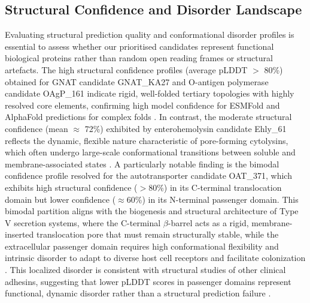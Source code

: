 \documentclass[pdflatex,sn-mathphys-num]{sn-jnl}
\begin{document}
\subsection{Structural Confidence and Disorder Landscape}
Evaluating structural prediction quality and conformational disorder profiles is essential to assess whether our prioritised candidates represent functional biological proteins rather than random open reading frames or structural artefacts. The high structural confidence profiles (average pLDDT $>$ 80\%) obtained for GNAT candidate GNAT\_KA27 and O-antigen polymerase candidate OAgP\_161 indicate rigid, well-folded tertiary topologies with highly resolved core elements, confirming high model confidence for ESMFold and AlphaFold predictions for complex folds \cite{jumper2021highly,lin2023evolutionary,abramson2024accurate}. In contrast, the moderate structural confidence (mean $\approx$ 72\%) exhibited by enterohemolysin candidate Ehly\_61 reflects the dynamic, flexible nature characteristic of pore-forming cytolysins, which often undergo large-scale conformational transitions between soluble and membrane-associated states \cite{mueller2009crystal}. A particularly notable finding is the bimodal confidence profile resolved for the autotransporter candidate OAT\_371, which exhibits high structural confidence ($>$80\%) in its C-terminal translocation domain but lower confidence ($\approx$60\%) in its N-terminal passenger domain. This bimodal partition aligns with the biogenesis and structural architecture of Type V secretion systems, where the C-terminal $\beta$-barrel acts as a rigid, membrane-inserted translocation pore that must remain structurally stable, while the extracellular passenger domain requires high conformational flexibility and intrinsic disorder to adapt to diverse host cell receptors and facilitate colonization \cite{vanulsen2018display}. This localized disorder is consistent with structural studies of other clinical adhesins, suggesting that lower pLDDT scores in passenger domains represent functional, dynamic disorder rather than a structural prediction failure \cite{henderson2004autotransporters,leo2012bacterial}. 
\end{document}
